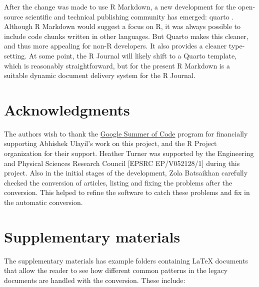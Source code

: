 After the change was made to use R Markdown, a new development for the open-source scientific and technical publishing community has emerged: quarto \citep{quarto}. Although R Markdown would suggest a focus on R, it was always possible to include code chunks written in other languages. But Quarto makes this cleaner, and thus more appealing for non-R developers. It also provides a cleaner type-setting. At some point, the R Journal will likely shift to a Quarto template, which is reasonably straightforward, but for the present R Markdown is a suitable dynamic document delivery system for the R Journal.

\section*{Acknowledgments}\label{acknowledgments}

The authors wish to thank the \href{https://summerofcode.withgoogle.com}{Google Summer of Code} program for financially supporting Abhishek Ulayil's work on this project, and the R Project organization for their support. Heather Turner was supported by the Engineering and Physical Sciences Research Council {[}EPSRC EP/V052128/1{]} during this project. Also in the initial stages of the development, Zola Batsaikhan carefully checked the conversion of articles, listing and fixing the problems after the conversion. This helped to refine the software to catch these problems and fix in the automatic conversion.

\section*{Supplementary materials}\label{supplementary-materials}

The supplementary materials has example folders containing LaTeX documents that allow the reader to see how different common patterns in the legacy documents are handled with the conversion. These include:

